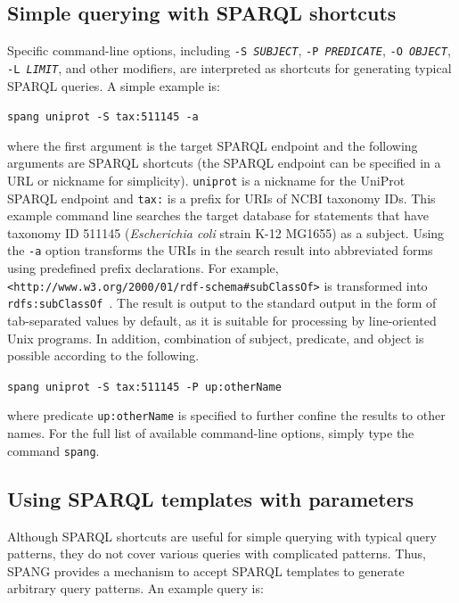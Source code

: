 \documentclass[runningheads]{llncs}
\begin{document}
\subsection{Simple querying with SPARQL shortcuts}

Specific command-line options, including \texttt{-S~\textit{SUBJECT}}, \texttt{-P~\textit{PREDICATE}}, \texttt{-O~\textit{OBJECT}}, \texttt{-L~\textit{LIMIT}}, and other modifiers, 
are interpreted as shortcuts for generating typical SPARQL queries. 
A simple example is: 

\texttt{spang uniprot -S tax:511145 -a}

\noindent where the first argument is the target SPARQL endpoint and the following arguments are SPARQL shortcuts (the SPARQL endpoint can be specified in a URL or nickname for simplicity). 
\texttt{uniprot} is a nickname for the UniProt SPARQL endpoint \citep{UniProt} and \texttt{tax:} is a prefix for URIs of NCBI taxonomy IDs. 
This example command line searches the target database for statements that have taxonomy ID 511145 ({\it Escherichia coli} strain K-12 MG1655) as a subject. Using the \texttt{-a} option transforms the URIs in the
 search result into abbreviated forms using predefined prefix declarations. For example,\\
\texttt{\textless http://www.w3.org/2000/01/rdf-schema\#subClassOf\textgreater} 
is transformed into \texttt{rdfs:subClassOf
}.
The result is output to the standard output in the form of tab-separated values by default, as it is suitable for processing by line-oriented Unix programs.
In addition, combination of subject, predicate, and object is possible according to the following.

\texttt{spang uniprot -S tax:511145 -P up:otherName}

\noindent where predicate {\tt up:otherName} is specified to further confine the results to other names. 
For the full list of available command-line options, simply type the command {\tt spang}.
\vspace*{-5pt}




\subsection{Using SPARQL templates with parameters}

Although SPARQL shortcuts are useful for simple querying with typical query patterns, they do not cover various
queries with complicated patterns. 
Thus, SPANG provides a mechanism to accept SPARQL templates to generate arbitrary query patterns. 
An example query is: 
\end{document}
